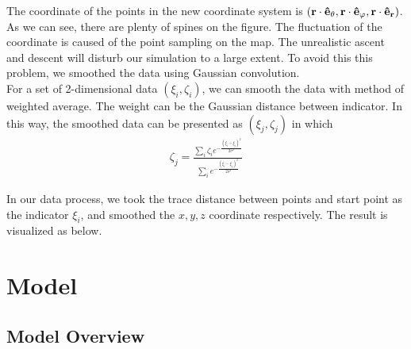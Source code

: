 \documentclass{mcmthesis}
\begin{document}
  The coordinate of the points in the new coordinate system is $({\bf r}\cdot {\bf \hat{e}_{\theta}}, {\bf r}\cdot {\bf \hat{e}_{\varphi}}, {\bf r}\cdot {\bf \hat{e}_{r}})$.\\

  As we can see, there are plenty of spines on the figure. The fluctuation of the coordinate is caused of the point sampling on the map. The unrealistic ascent and descent will disturb our simulation to a large extent. To avoid this this problem, we smoothed the data using Gaussian convolution. \\
  For a set of 2-dimensional data $(\xi_{i}, \zeta_{i})$, we can smooth the data with method of weighted average. The weight can be the Gaussian distance between indicator. In this way, the smoothed data can be presented as $(\xi_{j}, \zeta_{j})$ in which
  \begin{equation}
    \begin{aligned}
      \zeta_{j} = \frac{\sum_{i} \zeta_{i} e^{-\frac{(\xi_{i} - \xi_{j})^2}{2 \sigma^{2}}}}{\sum _{i} e^{- \frac{(\xi_{i} - \xi_{j})^{2}}{2 \sigma^{2}}}}
    \end{aligned}
  \end{equation}

  In our data process, we took the trace distance between points and start point as the indicator $\xi_{i}$, and smoothed the $x, y, z$ coordinate respectively. The result is visualized as below. 

  \section{Model}
  \subsection{Model Overview}
\end{document}
